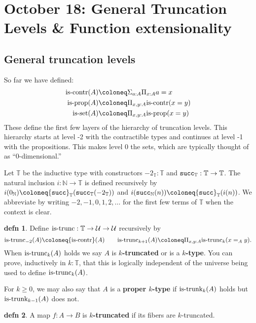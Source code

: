 \documentclass{amsart}
\theoremstyle{theorem}
\theoremstyle{definition}
\newtheorem*{defn}{defn}
\theoremstyle{remark}
\newcommand{\0}{\mathbbe{0}}
\newcommand{\1}{\mathbbe{1}}
\newcommand{\2}{\mathbbe{2}}
\newcommand{\3}{\mathbbe{3}}
\newcommand{\4}{\mathbbe{4}}
\newcommand{\term}[1]{{\textup{\texttt{#1}}}}
\newcommand{\type}[1]{{\textup{#1}}}
\newcommand{\bN}{{\mathbb{N}}}
\newcommand{\bT}{{\mathbb{T}}}
\newcommand{\suc}{\term{succ}_{\bN}}
\newcommand{\UU}{{\mathcal{U}}}
\newcommand{\is}[1]{\type{is-{#1}}}
\newcommand{\iscontr}{\type{is-contr}}
\newcommand{\isprop}{\type{is-prop}}
\begin{document}
\section*{October 18: General Truncation Levels \& Function extensionality}

\subsection*{General truncation levels}

So far we have defined:
\begin{align*}
\iscontr(A) &\coloneq \Sigma_{a:A} \Pi_{x:A} a=x\\
\isprop(A) &\coloneq \Pi_{x,y:A} \iscontr(x=y) \\
\is{set}(A) &\coloneq \Pi_{x,y:A} \isprop(x=y) 
\end{align*}
These define the first few layers of the hierarchy of truncation levels. This hierarchy starts at level -2 with the contractible types and continues at level -1 with the propositions. This makes level 0 the sets, which are typically thought of as ``0-dimensional.''

Let $\bT$ be the inductive type with constructors $-2_\bT : \bT$ and $\term{succ}_\bT : \bT \to \bT$. The natural inclusion $i \colon \bN \to \bT$ is defined recursively by $i(0_\bN) \coloneq \term{succ}_\bT (\term{succ}_\bT (-2_\bT))$ and $i(\suc(n)) \coloneq \term{succ}_\bT (i(n))$. We abbreviate by writing $-2,-1,0,1,2,\ldots$ for the first few terms of $\bT$ when the context is clear.

\begin{defn} Define $\is{trunc} : \bT \to \UU \to \UU$ recursively by
\[ \is{trunc}_{-2}(A) \coloneq \iscontr(A) \qquad \is{trunc}_{k+1}(A) \coloneq \Pi_{x,y:A} \is{trunc}_k(x=_Ay).\]
When $\is{trunc}_k(A)$ holds we say $A$ is \textbf{$k$-truncated} or is a \textbf{$k$-type}. You can prove, inductively in $k : \bT$, that this is logically independent of the universe being used to define $\is{trunc}_k(A)$.
\end{defn}



For $k \geq 0$, we may also say that $A$ is a \textbf{proper $k$-type} if $\is{trunk}_k(A)$ holds but $\is{trunk}_{k-1}(A)$ does not.


\begin{defn} A map $f \colon A \to B$ is \textbf{$k$-truncated} if its fibers are $k$-truncated.
\end{defn}
\end{document}
